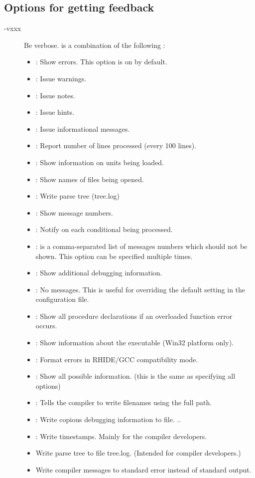 %
%
\subsection{Options for getting feedback}
\label{se:feedbackoptions}
\begin{description}
\item[-vxxx] Be verbose.  is a combination of the following :
\begin{itemize}
\item {} : Show errors. This option is on by default.
\item {} : Issue warnings.
\item {} : Issue notes.
\item {} : Issue hints.
\item {} : Issue informational messages.
\item {} : Report number of lines processed (every 100 lines).
\item {} : Show information on units being loaded.
\item {} : Show names of files being opened.
\item {} : Write parse tree (tree.log)
\item {} : Show message numbers.
\item {} : Notify on each conditional being processed.
\item {} :  is a comma-separated list of messages numbers which should not be shown.
This option can be specified multiple times.
\item {} : Show additional debugging information.
\item {} : No messages. This is useful for overriding the default
          setting in the configuration file.
\item {} : Show all procedure declarations if an overloaded function error occurs.
\item {} : Show information about the executable (Win32 platform only).
\item {} : Format errors in RHIDE/GCC compatibility mode.
\item {} : Show all possible information. (this is the same as specifying all options)
\item {} : Tells the compiler to write filenames using the full path.
\item {} : Write copious debugging information to file.
..
\item {} : Write timestamps. Mainly for the compiler developers.
\item {} Write parse tree to file tree.log. (Intended for compiler  developers.)
\item {} Write compiler messages to standard error instead of standard output.
\end{itemize}

\end{description}
